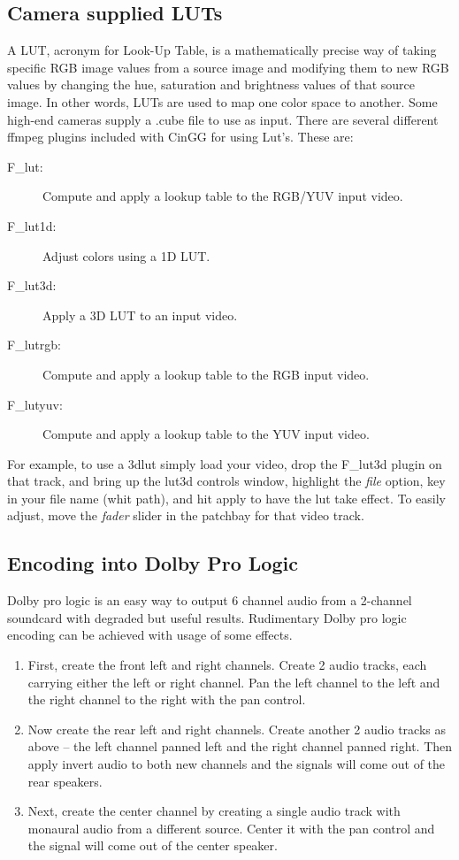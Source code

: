\subsection{Camera supplied LUTs}%
\label{sub:camera_supplied_luts}

A LUT, acronym for Look-Up Table, is a mathematically precise way of taking specific RGB image values from a source image and modifying them to new RGB values by changing the hue, saturation and brightness values of that source image. In other words, LUTs are used to map one color space to another.  Some high-end cameras supply a .cube file to use as input. There are several different ffmpeg plugins included with CinGG for using Lut's.  These are:

\begin{description}
	\item[F\_lut:] Compute and apply a lookup table to the RGB/YUV input video.
	\item[F\_lut1d:] Adjust colors using a 1D LUT.
	\item[F\_lut3d:] Apply a 3D LUT to an input video.
	\item[F\_lutrgb:] Compute and apply a lookup table to the RGB input video.
	\item[F\_lutyuv:] Compute and apply a lookup table to the YUV input video.
\end{description}

For example, to use a 3dlut simply load your video, drop the F\_lut3d plugin on that track, and bring up the lut3d controls window, highlight the \textit{file} option, key in your file name (whit path), and hit apply to have the lut take effect.  To easily adjust, move the \textit{fader} slider in the patchbay for that video track.

\subsection{Encoding into Dolby Pro Logic}%
\label{sub:encoding_dolby_pro_logic}

Dolby pro logic is an easy way to output 6 channel audio from a 2-channel soundcard with degraded but useful results. Rudimentary Dolby pro logic encoding can be achieved with usage of some effects.

\begin{enumerate}
	\item First, create the front left and right channels. Create 2 audio tracks, each carrying either the left or
	right channel. Pan the left channel to the left and the right channel to the right with the pan control.
	\item Now create the rear left and right channels. Create another 2 audio tracks as above -- the left channel
	panned left and the right channel panned right. Then apply invert audio to both new channels and
	the signals will come out of the rear speakers.
	\item Next, create the center channel by creating a single audio track with monaural audio from a
	different source. Center it with the pan control and the signal will come out of the center speaker.
\end{enumerate}

